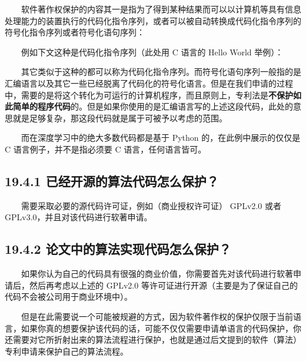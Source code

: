   软件著作权保护的内容其一是指为了得到某种结果而可以以计算机等具有信息处理能力的装置执行的代码化指令序列，或者可以被自动转换成代码化指令序列的符号化指令序列或者符号化语句序列：

  例如下文这种是代码化指令序列（此处用 C 语言的 Hello World 举例）：

\begin{Shaded}
\begin{Highlighting}[]
\NormalTok{\{}
\NormalTok{);}
    \NormalTok{;}
\NormalTok{\}}
\end{Highlighting}
\end{Shaded}

  其它类似于这种的都可以称为代码化指令序列。而符号化语句序列一般指的是汇编语言以及其它一些已经脱离了代码化的符号化语言。但是在我们申请的过程中，需要的是将这个转化为可运行的计算机程序，而且原则上，专利法是\textbf{不保护如此简单的程序代码}的。但是如果你使用的是汇编语言写的上述这段代码，此处的意思就是足够复杂，那这段代码就是属于可被予以考虑的范围。

  而在深度学习中的绝大多数代码都是基于 Python 的，在此例中展示的仅仅是 C
语言例子，并不是指必须要 C 语言，任何语言皆可。

\subsection{19.4.1
已经开源的算法代码怎么保护？}\label{ux5df2ux7ecfux5f00ux6e90ux7684ux7b97ux6cd5ux4ee3ux7801ux600eux4e48ux4fddux62a4}

  需要采取必要的源代码许可证，例如（商业授权许可证） GPLv2.0 或者
GPLv3.0，并且对该代码进行软著申请。

\subsection{19.4.2
论文中的算法实现代码怎么保护？}\label{ux8bbaux6587ux4e2dux7684ux7b97ux6cd5ux5b9eux73b0ux4ee3ux7801ux600eux4e48ux4fddux62a4}

  如果你认为自己的代码具有很强的商业价值，你需要首先对该代码进行软著申请后，然后再考虑以上述的
GPLv2.0
等许可证进行开源（主要是为了保证自己的代码不会被公司用于商业环境中）。

  但是在此需要说一个可能被规避的方式，因为软件著作权的保护仅限于当前语言，如果你真的想要保护该代码的话，可能不仅仅需要申请单语言的代码保护，你还需要对它所折射出来的算法流程进行保护，也就是通过后文提到的软件（算法）专利申请来保护自己的算法流程。

